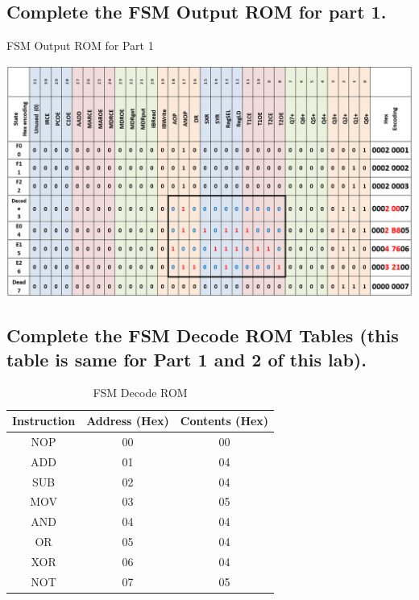 \documentclass{article}
\begin{document}
	\subsection{Complete the FSM Output ROM for part 1.}
	\begin{table}[!ht]
		\centering
		\caption{FSM Output ROM for Part 1}
		\vspace{0.2cm}
		\includegraphics[width=0.72\textheight]{fsm_output_part1.png}
	\end{table}

	\pagebreak

	\subsection{Complete the FSM Decode ROM Tables (this table is same for Part 1 and 2 of this lab).}
	\begin{table}[!ht]
		\centering
		\caption{FSM Decode ROM}
		\vspace{0.2cm}
		\begin{tabular}{|c|c|c|}
			\hline
			Instruction & Address (Hex) & Contents (Hex)\\
			\hline\hline
			NOP & 00 & 00\\
			\hline
			ADD & 01 & 04\\
			\hline
			SUB & 02 & 04\\
			\hline
			MOV & 03 & 05\\
			\hline
			AND & 04 & 04\\
			\hline
			OR & 05 & 04\\
			\hline
			XOR & 06 & 04\\
			\hline
			NOT & 07 & 05\\
			\hline
		\end{tabular}
	\end{table}
\end{document}
